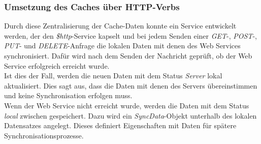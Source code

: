 \subsubsection*{Umsetzung des Caches über HTTP-Verbs}
\label{sssec:Http-Verbs}
Durch diese Zentralisierung der Cache-Daten konnte ein Service entwickelt werden, der den \textit{\$http}-Service kapselt und bei jedem Senden einer \textit{GET}-, \textit{POST}-, \textit{PUT}- und \textit{DELETE}-Anfrage die lokalen Daten mit denen des Web Services synchronisiert. Dafür wird nach dem Senden der Nachricht geprüft, ob der Web Service erfolgreich erreicht wurde.\\
Ist dies der Fall, werden die neuen Daten mit dem Status \textit{Server} lokal aktualisiert. Dies sagt aus, dass die Daten mit denen des Servers übereinstimmen und keine Synchronisation erfolgen muss.\\
Wenn der Web Service nicht erreicht wurde, werden die Daten mit dem Status \textit{local} zwischen gespeichert. Dazu wird ein \textit{SyncData}-Objekt unterhalb des lokalen Datensatzes angelegt. Dieses definiert Eigenschaften mit Daten für spätere Synchronisationsprozesse.

